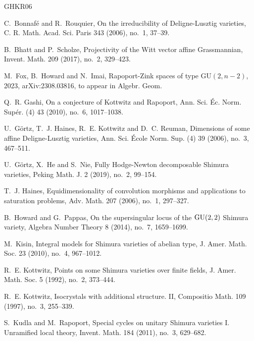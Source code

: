 \documentclass[12pt,a4paper]{article}
\begin{document}
\begin{thebibliography}{GHKR06}
	\providecommand{\url}[1]{\texttt{#1}}
	\providecommand{\urlprefix}{URL }
	\providecommand{\eprint}[2][]{\url{#2}}
	
	C.~Bonnaf\'{e} and R.~Rouquier, On the irreducibility of {D}eligne-{L}usztig
	varieties, C. R. Math. Acad. Sci. Paris 343 (2006), no.~1, 37--39.
	
	B.~Bhatt and P.~Scholze, Projectivity of the {W}itt vector affine
	{G}rassmannian, Invent. Math. 209 (2017), no.~2, 329--423.
	
	M.~Fox, B.~Howard and N.~Imai, Rapoport-Zink spaces of type
	$\mathrm{GU}(2,n-2)$, 2023, arXiv:2308.03816, to appear in Algebr. Geom.
	
	Q.~R. Gashi, On a conjecture of {K}ottwitz and {R}apoport, Ann. Sci. \'{E}c.
	Norm. Sup\'{e}r. (4) 43 (2010), no.~6, 1017--1038.
	
	U.~G\"{o}rtz, T.~J. Haines, R.~E. Kottwitz and D.~C. Reuman, Dimensions of some
	affine {D}eligne-{L}usztig varieties, Ann. Sci. \'{E}cole Norm. Sup. (4) 39
	(2006), no.~3, 467--511.
	
	U.~G\"{o}rtz, X.~He and S.~Nie, Fully {H}odge-{N}ewton decomposable {S}himura
	varieties, Peking Math. J. 2 (2019), no.~2, 99--154.
	
	T.~J. Haines, Equidimensionality of convolution morphisms and applications to
	saturation problems, Adv. Math. 207 (2006), no.~1, 297--327.
	
	B.~Howard and G.~Pappas, On the supersingular locus of the {${\rm GU}(2,2)$}
	{S}himura variety, Algebra Number Theory 8 (2014), no.~7, 1659--1699.
	
	M.~Kisin, Integral models for {S}himura varieties of abelian type, J. Amer.
	Math. Soc. 23 (2010), no.~4, 967--1012.
	
	R.~E. Kottwitz, Points on some {S}himura varieties over finite fields, J. Amer.
	Math. Soc. 5 (1992), no.~2, 373--444.
	
	R.~E. Kottwitz, Isocrystals with additional structure. {II}, Compositio Math.
	109 (1997), no.~3, 255--339.
	
	S.~Kudla and M.~Rapoport, Special cycles on unitary {S}himura varieties {I}.
	{U}nramified local theory, Invent. Math. 184 (2011), no.~3, 629--682.
	

\end{thebibliography}
\end{document}
